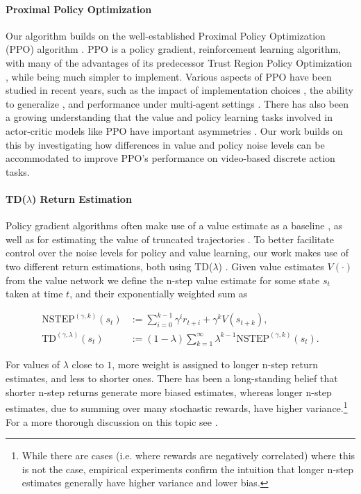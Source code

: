 \documentclass{article}
\begin{document}
\paragraph{Proximal Policy Optimization} Our algorithm builds on the well-established Proximal Policy Optimization (PPO) algorithm \cite{schulman2017proximal}. PPO is a policy gradient, reinforcement learning algorithm, with many of the advantages of its predecessor Trust Region Policy Optimization \cite{schulman2015trust}, while being much simpler to implement. Various aspects of PPO have been studied in recent years, such as the impact of implementation choices \cite{engstrom2019implementation, shengyi2022the37implementation}, the ability to generalize \cite{cobbe2021phasic, raileanu2021decoupling}, and performance under multi-agent settings \cite{yu2021surprising}. There has also been a growing understanding that the value and policy learning tasks involved in actor-critic models like PPO have important asymmetries \cite{raileanu2021decoupling, cobbe2021phasic}. Our work builds on this by investigating how differences in value and policy noise levels can be accommodated to improve PPO's performance on video-based discrete action tasks.




\paragraph{TD($\lambda$) Return Estimation}



Policy gradient algorithms often make use of a value estimate as a baseline \cite{mnih2016asynchronous}, as well as for estimating the value of truncated trajectories \cite{cichosz1994truncating}. To better facilitate control over the noise levels for policy and value learning, our work makes use of two different return estimations, both using TD($\lambda$) \cite{sutton1988learning}. Given value estimates $V(\cdot)$ from the value network we define the n-step value estimate for some state $s_t$ taken at time $t$, and their exponentially weighted sum as

\begin{align}
    \text{NSTEP}^{(\gamma, k)}(s_t) &:= \sum_{i=0}^{k-1} \gamma^i r_{t+i} + \gamma^k V(s_{t+k}),\\
    \text{TD}^{(\gamma, \lambda)}(s_t) &:= (1-\lambda) \sum_{k=1}^{\infty} \lambda^{k-1} \text{NSTEP}^{(\gamma, k)}(s_t).
\end{align}

For values of $\lambda$ close to $1$, more weight is assigned to longer n-step return estimates, and less to shorter ones. There has been a long-standing belief that shorter n-step returns generate more biased estimates, whereas longer n-step estimates, due to summing over many stochastic rewards, have higher variance.\footnote{While there are cases (i.e. where rewards are negatively correlated) where this is not the case, empirical experiments confirm the intuition that longer n-step estimates generally have higher variance and lower bias.} For a more thorough discussion on this topic see \cite{kearns2000bias}.
\end{document}
